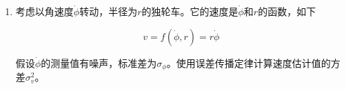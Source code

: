 \begin{enumerate}
\item 考虑以角速度$\dot{\phi}$转动，半径为$r$的独轮车。它的速度是$\dot{\phi}$和$r$的函数，如下

\begin{equation}
\nonumber
v=f(\dot{\phi},r)=r\dot{\phi}
\end{equation} 

假设$\dot{\phi}$的测量值有噪声，标准差为$\sigma_{\phi}$。使用误差传播定律计算速度估计值的方差$\sigma_v^2$。

\end{enumerate}
\normalsize
